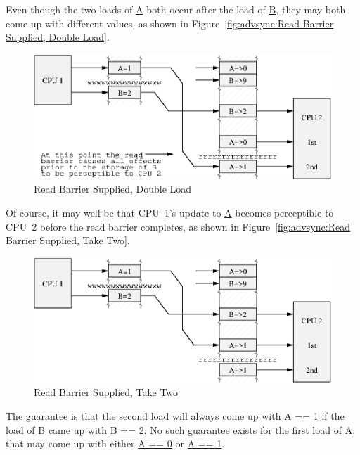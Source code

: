 Even though the two loads of \url{A}
both occur after the load of \url{B}, they may both
come up with different values, as shown in
Figure~\ref{fig:advsync:Read Barrier Supplied, Double Load}.

\begin{figure}[htb]
\begin{center}
\includegraphics{advsync/ReadBarrierSupplied1}
\end{center}
\caption{Read Barrier Supplied, Double Load}
\end{figure}

Of course, it may well be that CPU~1's update to \url{A} becomes perceptible
to CPU~2 before the read barrier completes, as shown in
Figure~\ref{fig:advsync:Read Barrier Supplied, Take Two}.

\begin{figure}[htb]
\begin{center}
\includegraphics{advsync/ReadBarrierSupplied2}
\end{center}
\caption{Read Barrier Supplied, Take Two}
\end{figure}

The guarantee is that the second load will always come up with \url{A == 1}
if the
load of \url{B} came up with \url{B == 2}.
No such guarantee exists for the first load of
\url{A}; that may come up with either \url{A == 0} or \url{A == 1}.

